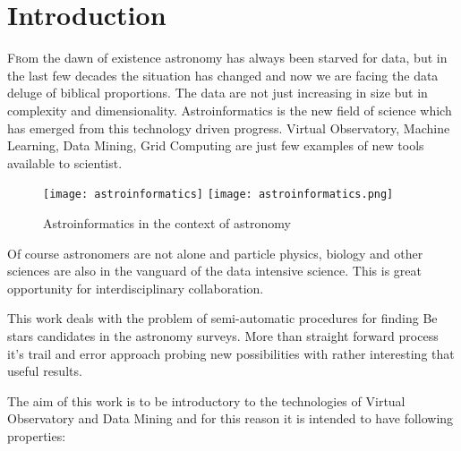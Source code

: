 \chapter*{Introduction}


\renewcommand{\LettrineFontHook}{\color{red}}


\lettrine[lines = 3, loversize=-0.1, lraise=0.1]{F}rom the dawn of
existence astronomy has always been starved for data, but in the last
few decades the situation has changed and now we are facing the data
deluge of biblical proportions. The data are not just increasing in
size but in complexity and dimensionality. \cite{ballastroinformatics}
Astroinformatics is the new field of science which has emerged from
this technology driven progress.  Virtual Observatory, Machine
Learning, Data Mining, Grid Computing are just few examples of new
tools available to scientist.


\vspace{10pt}
\begin{figure}[!htbp]
  \begin{center}
    \leavevmode
    \ifpdf
    \texttt{[image: astroinformatics]}
    \else
    \texttt{[image: astroinformatics.png]}
    \fi
    \caption{Astroinformatics in the context of astronomy \cite{ballastroinformatics} }
    \label{FigAir}
  \end{center}
\end{figure}
\vspace{-10pt}



Of course astronomers are not alone and particle physics, biology and
other sciences are also in the vanguard of the data intensive
science. This is great opportunity for interdisciplinary
collaboration.

This work deals with the problem of semi-automatic procedures for
finding Be stars \cite{porter2003classical} candidates in the
astronomy surveys. More than straight forward process it's trail and
error approach probing new possibilities with rather interesting that
useful results.

The aim of this work is to be introductory to the technologies of
Virtual Observatory and Data Mining and for this reason it is intended
to have following properties:

